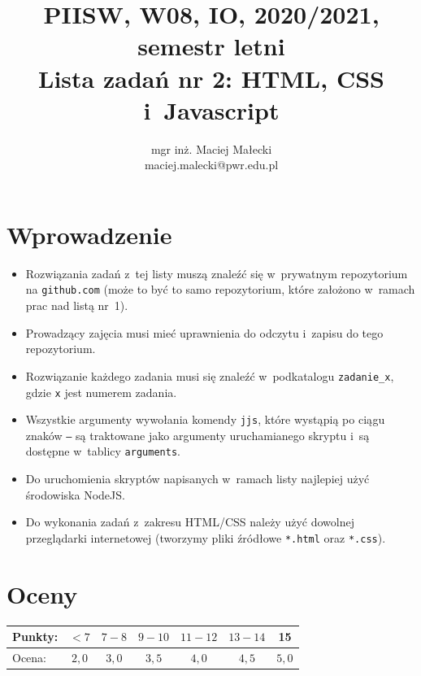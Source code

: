 \documentclass[12pt]{article}
\title{PIISW, W08, IO, 2020/2021, semestr letni\\Lista zadań nr 2: HTML, CSS i~Javascript}
\author{mgr inż. Maciej Małecki\\\small{maciej.malecki@pwr.edu.pl}}
\begin{document}
    \maketitle

    \section*{Wprowadzenie}
    \begin{itemize}
        \item Rozwiązania zadań z~tej listy muszą znaleźć się w~prywatnym repozytorium na \texttt{github.com} (może to być to samo repozytorium, które założono w~ramach prac nad listą nr~1).
        \item Prowadzący zajęcia musi mieć uprawnienia do odczytu i~zapisu do tego repozytorium.
        \item Rozwiązanie każdego zadania musi się znaleźć w~podkatalogu \texttt{zadanie\_x}, gdzie \texttt{x} jest numerem zadania.
        \item Wszystkie argumenty wywołania komendy \texttt{jjs}, które wystąpią po ciągu znaków \texttt{--} są traktowane jako argumenty uruchamianego skryptu i~są dostępne w~tablicy \texttt{arguments}.
		\item Do uruchomienia skryptów napisanych w~ramach listy najlepiej użyć środowiska NodeJS.
        \item Do wykonania zadań z~zakresu HTML/CSS należy użyć dowolnej przeglądarki internetowej (tworzymy pliki źródłowe \texttt{*.html} oraz \texttt{*.css}).
    \end{itemize}

    \section*{Oceny}
    \begin{tabular}{|l|c|c|c|c|c|c|}
        \hline
        Punkty: & $<7$ & $7-8$ & $9-10$ & $11-12$ & $13-14$ & 15\\
        \hline
        Ocena:  & $2,0$ & $3,0$ & $3,5$ & $4,0$ & $4,5$ & $5,0$\\
        \hline
    \end{tabular}
\end{document}

